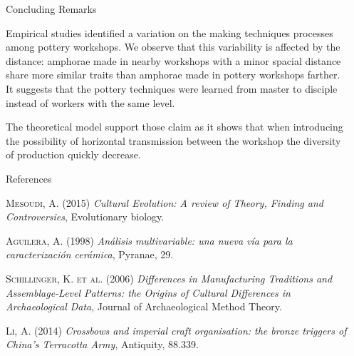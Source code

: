 \documentclass[final]{beamer}
\newlength{\sepwid}
\newlength{\onecolwid}
\begin{document}
\begin{frame}[t]
\begin{columns}[t]
\begin{column}{\sepwid}\end{column} %

\begin{column}{\onecolwid} %

\begin{block}{Concluding Remarks}
\justify

Empirical studies identified a variation on the making techniques processes among pottery workshops. We observe that this variability is affected by the distance: amphorae made in nearby workshops with a minor spacial distance share more similar traits than amphorae made in pottery workshops farther. It suggests that the pottery techniques were learned from master to disciple instead of workers with the same level. 

The theoretical model support those claim as it shows that when introducing the possibility of horizontal transmission between the workshop the diversity of production quickly decrease.
 
\end{block}

\begin{block}{References}
\small

\begin{thebibliography}{50}

\textsc{Mesoudi, A. (2015)}
\textit{Cultural Evolution: A review of Theory, Finding and Controversies}, Evolutionary biology.

\textsc{Aguilera, A. (1998)}
\textit{An\'alisis multivariable: una nueva v\'ia para la caracterizaci\'on cer\'amica}, Pyranae, 29.

\textsc{Schillinger, K. et al. (2006)}
\textit{Differences in Manufacturing Traditions and Assemblage-Level Patterns: the Origins of Cultural Differences in Archaeological Data}, Journal of Archaeological Method Theory.

\textsc{Li, A. (2014)}
\textit{Crossbows and imperial craft organisation: the bronze triggers of China's Terracotta Army}, Antiquity, 88.339.

\end{thebibliography}
%	

\end{block}


\end{column}
\end{columns}
\end{frame}
\end{document}
